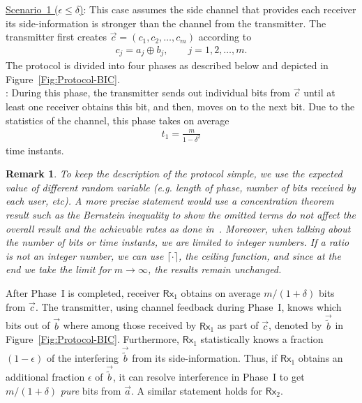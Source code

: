 \documentclass[journal,12pt,draftcls,onecolumn]{IEEEtran}
\newtheorem{remark}{Remark}
\newcommand{\msf}{\mathsf}
\begin{document}
\noindent \underline{Scenario~1 ($\epsilon \leq \delta$)}: This case assumes the side channel that provides each receiver its side-information is stronger than the channel from the transmitter. The transmitter first creates $\vec{c} = \left(c_1,c_2,\ldots,c_{m} \right)$ according to
\begin{align}
c_j = a_j \oplus b_j, \qquad j=1,2,\ldots,m.
\end{align}
The protocol is divided into four phases as described below and depicted in Figure~\ref{Fig:Protocol-BIC}. \\
: During this phase, the transmitter sends out individual bits from $\vec{c}$ until at least one receiver obtains this bit, and then, moves on to the next bit. Due to the statistics of the channel, this phase takes on average
\begin{align}
t_1 = \frac{m}{1-\delta^2}
\end{align}
time instants.
\begin{remark}
To keep the description of the protocol simple, we use the expected value of different random variable (\emph{e.g.} length of phase, number of bits received by each user, etc). A more precise statement would use a concentration theorem result such as the Bernstein inequality to show the omitted terms do not affect the overall result and the achievable rates as done in~\cite{AlirezaBFICDelayed,vahid2018throughput}. Moreover, when talking about the number of bits or time instants, we are limited to integer numbers. If a ratio is not an integer number, we can use $\lceil \cdot \rceil$, the ceiling function, and since at the end we take the limit for $m \rightarrow \infty$, the results remain unchanged.
\end{remark}
After Phase~I is completed, receiver $\msf{Rx}_1$ obtains on average $m/(1+\delta)$ bits from $\vec{c}$. The transmitter, using channel feedback during Phase~I, knows which bits out of $\vec{b}$ where among those received by $\msf{Rx}_1$ as part of $\vec{c}$, denoted by $\vec{\tilde{b}}$ in Figure~\ref{Fig:Protocol-BIC}. Furthermore, $\msf{Rx}_1$ statistically knows a fraction $(1-\epsilon)$ of the interfering $\vec{\tilde{b}}$ from its side-information. Thus, if $\msf{Rx}_1$ obtains an additional fraction $\epsilon$ of $\vec{\tilde{b}}$, it can resolve interference in Phase~I to get $m/(1+\delta)$ {\it pure} bits from $\vec{a}$. A similar statement holds for $\msf{Rx}_2$. %
\end{document}
